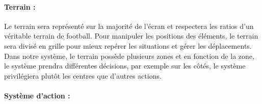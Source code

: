 \paragraph{Terrain :} Le terrain sera représenté sur la majorité de l'écran et respectera les ratios d’un véritable terrain de football. Pour manipuler les positions des éléments, le terrain sera divisé en grille pour mieux repérer les situations et gérer les déplacements. Dans notre système, le terrain possède plusieurs zones et en fonction de la zone, le système prendra différentes décisions, par exemple sur les côtés, le système privilégiera plutôt les centres que d’autres actions.

\paragraph{Système d'action :}

